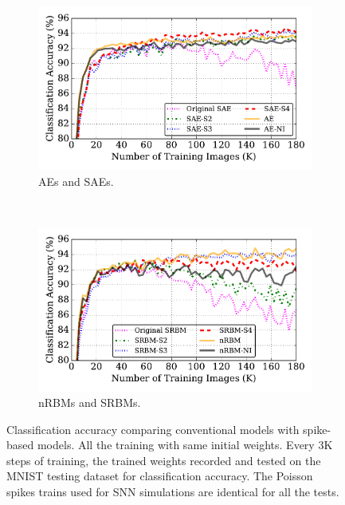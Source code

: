 \begin{figure}
	\centering
	\begin{subfigure}[t]{0.8\textwidth}
		\includegraphics[width=\textwidth]{pics_sdlm/43_MNIST_SAE_all/compare_result.pdf}
		\caption{AEs and SAEs.}
	\end{subfigure}\\
	\begin{subfigure}[t]{0.8\textwidth}
		\includegraphics[width=\textwidth]{pics_sdlm/53_MNIST_SRBM_all/compare_result.pdf}
		\caption{nRBMs and SRBMs.}
	\end{subfigure}
	\DIFdelbeginFL %
\DIFdelendFL \DIFaddbeginFL \caption[Comparisons of classification accuracy between conventional and spiking models.]{\DIFaddendFL Classification accuracy comparing conventional models with spike-based models. All the training \DIFdelbeginFL {}\DIFdelendFL \DIFaddbeginFL {}\DIFaddendFL with \DIFaddbeginFL {}\DIFaddendFL same initial weights. Every 3K steps of training, the trained weights \DIFdelbeginFL {}\DIFdelendFL \DIFaddbeginFL {}\DIFaddendFL recorded and tested on the MNIST testing dataset for classification accuracy. The Poisson spikes trains used for SNN simulations are identical for all the tests.}
	\label{fig:sdlm_ca}
\end{figure}
\DIFdelbegin {}\DIFdelend \DIFaddbegin 


